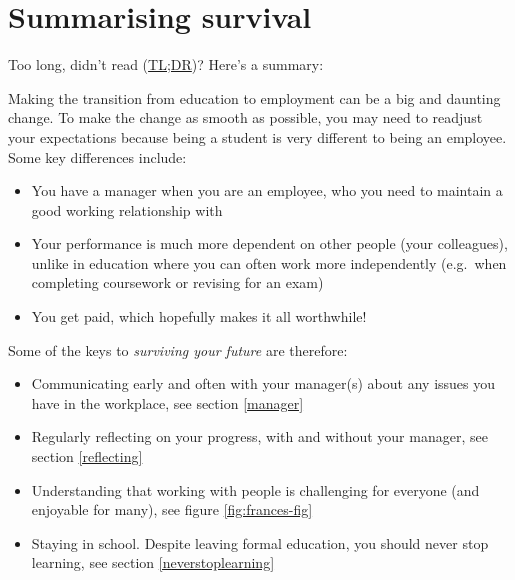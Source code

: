 \documentclass[
]{book}
\providecommand{\tightlist}{%
  \setlength{\itemsep}{0pt}\setlength{\parskip}{0pt}}
\begin{document}
\hypertarget{tldr10}{%
\section{Summarising survival}\label{tldr10}}

Too long, didn't read (\href{https://en.wiktionary.org/wiki/too_long;_didn\%27t_read}{TL;DR})? Here's a summary:

Making the transition from education to employment can be a big and daunting change. To make the change as smooth as possible, you may need to readjust your expectations because being a student is very different to being an employee. Some key differences include:

\begin{itemize}
\tightlist
\item
  You have a manager when you are an employee, who you need to maintain a good working relationship with
\item
  Your performance is much more dependent on other people (your colleagues), unlike in education where you can often work more independently (e.g.~when completing coursework or revising for an exam)
\item
  You get paid, which hopefully makes it all worthwhile!
\end{itemize}

Some of the keys to \emph{surviving your future} are therefore:

\begin{itemize}
\tightlist
\item
  Communicating early and often with your manager(s) about any issues you have in the workplace, see section \ref{manager}
\item
  Regularly reflecting on your progress, with and without your manager, see section \ref{reflecting}
\item
  Understanding that working with people is challenging for everyone (and enjoyable for many), see figure \ref{fig:frances-fig}
\item
  Staying in school. Despite leaving formal education, you should never stop learning, see section \ref{neverstoplearning}
\end{itemize}
\end{document}
